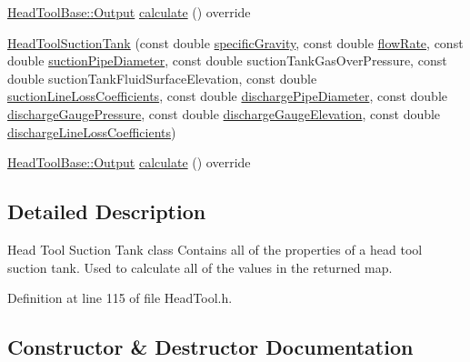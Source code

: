 \begin{DoxyCompactItemize}
\item 
\hyperlink{struct_head_tool_base_1_1_output}{Head\+Tool\+Base\+::\+Output} \hyperlink{class_head_tool_suction_tank_ad91b31b9f524b9892da26e5ecb9e191e}{calculate} () override
\item 
\hyperlink{class_head_tool_suction_tank_a96579ecd414c723362db00cfeb24cd46}{Head\+Tool\+Suction\+Tank} (const double \hyperlink{class_head_tool_base_ae5af2380fb5db2c25281ef663a5fb65f}{specific\+Gravity}, const double \hyperlink{class_head_tool_base_acf4c03cb62cbf63aba017ce063989fbc}{flow\+Rate}, const double \hyperlink{class_head_tool_base_a357365fc5ef346ce7bcb089c9d1a95e1}{suction\+Pipe\+Diameter}, const double suction\+Tank\+Gas\+Over\+Pressure, const double suction\+Tank\+Fluid\+Surface\+Elevation, const double \hyperlink{class_head_tool_base_ac74c6f6f8ab387efe7b77e0ce6ecd84e}{suction\+Line\+Loss\+Coefficients}, const double \hyperlink{class_head_tool_base_a126a397bd3d87b68864e1962c70bb45e}{discharge\+Pipe\+Diameter}, const double \hyperlink{class_head_tool_base_a39c854f13b16967e02a67cd1aaee07c4}{discharge\+Gauge\+Pressure}, const double \hyperlink{class_head_tool_base_a9ed2160992f8da2e335d919cf9aedd08}{discharge\+Gauge\+Elevation}, const double \hyperlink{class_head_tool_base_a147c035c7422406c594c5fd42ab11eb0}{discharge\+Line\+Loss\+Coefficients})
\item 
\hyperlink{struct_head_tool_base_1_1_output}{Head\+Tool\+Base\+::\+Output} \hyperlink{class_head_tool_suction_tank_ad91b31b9f524b9892da26e5ecb9e191e}{calculate} () override
\end{DoxyCompactItemize}


\subsection{Detailed Description}
Head Tool Suction Tank class Contains all of the properties of a head tool suction tank. Used to calculate all of the values in the returned map. 

Definition at line 115 of file Head\+Tool.\+h.



\subsection{Constructor \& Destructor Documentation}
\mbox{\label{class_head_tool_suction_tank_a96579ecd414c723362db00cfeb24cd46}} 
